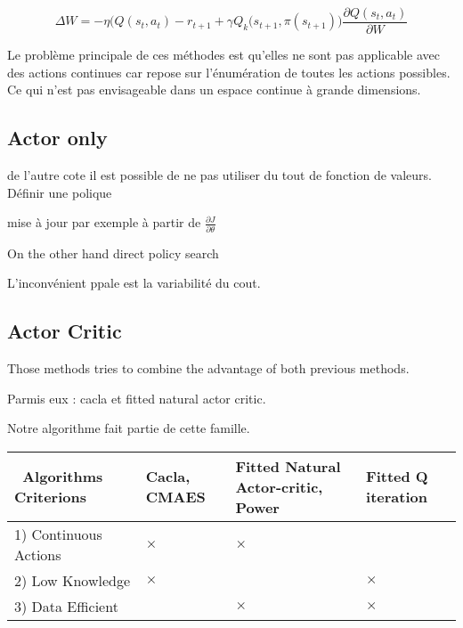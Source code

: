 
\begin{equation}
 \Delta W = - \eta \big( Q(s_t, a_t) - r_{t+1} + \gamma Q_k(s_{t+1}, \pi(s_{t+1}) \big) \frac{\partial Q(s_t, a_t)}{\partial W}
\end{equation}

Le problème principale de ces méthodes est qu'elles ne sont pas applicable avec des actions continues
car repose sur l'énumération de toutes les actions possibles. Ce qui n'est pas envisageable dans un
espace continue à grande dimensions.

\subsection{Actor only}

de l'autre cote il est possible de ne pas utiliser du tout de fonction de valeurs.
Définir une polique 

mise à jour par exemple à partir de $ \frac{\partial J}{\partial \theta} $

On the other hand 
direct policy search

L'inconvénient ppale est la variabilité du cout.

\subsection{Actor Critic}

Those methods tries to combine the advantage of both previous methods.

Parmis eux : cacla et fitted natural actor critic.

Notre algorithme fait partie de cette famille.

\begin{tabular}{|p{3.4cm}|>{\centering\arraybackslash}p{1.2cm}|>{\centering\arraybackslash}p{3cm}|>{\centering\arraybackslash}p{1.8cm}|}
 \hline
 ~\mbox{Algorithms} ~ \mbox{Criterions} & Cacla, CMAES & Fitted Natural Actor-critic, Power & Fitted Q iteration \\ \hline
 1) Continuous Actions & $\times$ & $\times$ & \\ \hline
 2) Low Knowledge & $\times$ & & $\times$ \\ \hline
 3) Data Efficient &  & $\times$ & $\times$\\ \hline
\end{tabular}


